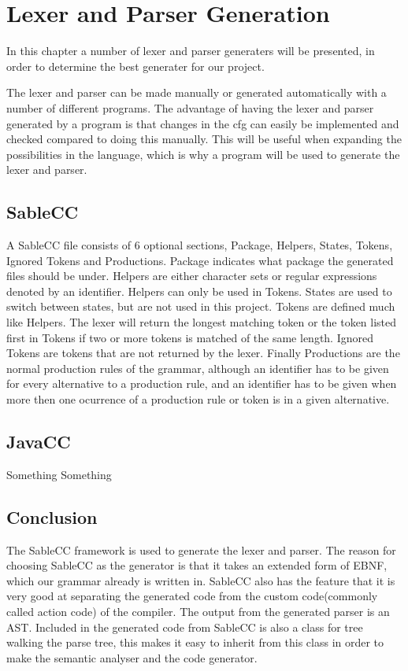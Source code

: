 \chapter{Lexer and Parser Generation}
In this chapter a number of lexer and parser generaters will be presented, in order to determine the best generater for our project.

The lexer and parser can be made manually or generated automatically with a number of different programs. The advantage of having the lexer and parser generated by a program is that changes in the cfg can easily be implemented and checked compared to doing this manually. This will be useful when expanding the possibilities in the language, which is why a program will be used to generate the lexer and parser.

\section{SableCC}
A SableCC file consists of 6 optional sections, Package, Helpers, States, Tokens, Ignored Tokens and Productions.
Package indicates what package the generated files should be under. Helpers are either character sets or regular expressions denoted by an identifier. Helpers can only be used in Tokens. States are used to switch between states, but are not used in this project. Tokens are defined much like Helpers. The lexer will return the longest matching token or the token listed first in Tokens if two or more tokens is matched of the same length. Ignored Tokens are tokens that are not returned by the lexer. Finally Productions are the normal production rules of the grammar, although an identifier has to be given for every alternative to a production rule, and an identifier has to be given when more then one ocurrence of a production rule or token is in a given alternative.

\section{JavaCC}
Something Something

\section{Conclusion}
The SableCC framework is used to generate the lexer and parser. The reason for choosing SableCC as the generator is that it takes an extended form of EBNF, which our grammar already is written in. SableCC also has the feature that it is very good at separating the generated code from the custom code(commonly called action code) of the compiler. The output from the generated parser is an AST. Included in the generated code from SableCC is also a class for tree walking the parse tree, this makes it easy to inherit  from this class in order to make the semantic analyser and the code generator.